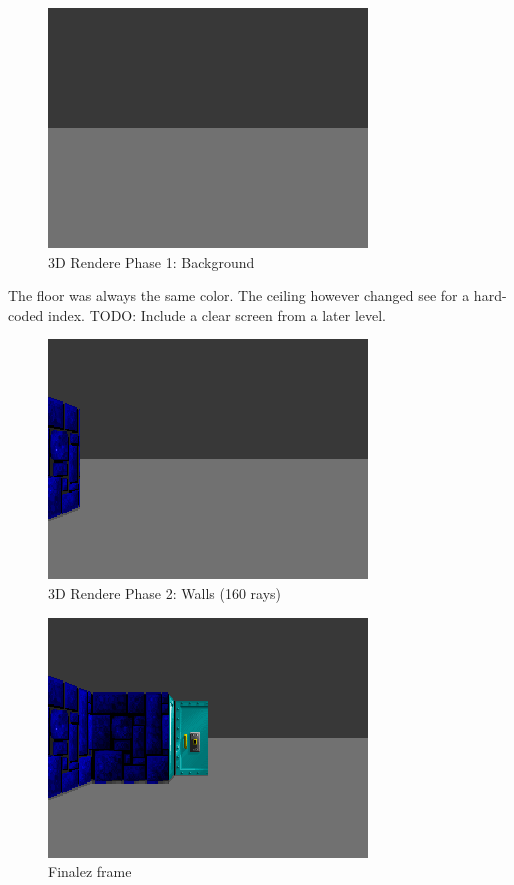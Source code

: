 \documentclass[book.tex]{subfiles}
\begin{document}
\begin{figure}[H]
\centering
 \includegraphics[scale=1.3]{screenshots/wolf3d_1_background.png}
 \caption{3D Rendere Phase 1: Background} \label{fig:mips}
 \end{figure}
The floor was always the same color. The ceiling however changed see  for a hard-coded index. TODO: Include a clear screen from a later level.\\
\begin{figure}[H]
 \centering
  \includegraphics[scale=1.3]{screenshots/wolf3d_4_partial_wall_32rays.png}
  \caption{3D Rendere Phase 2: Walls (160 rays)}
  \label{fig:mips}
\end{figure}
 
\begin{figure}[H]
 \centering
  \includegraphics[scale=1.3]{screenshots/wolf3d_5_partialwalls_160rays.png}
 \caption{Finalez frame} 
 \label{fig:mips}
\end{figure}
 
\end{document}
